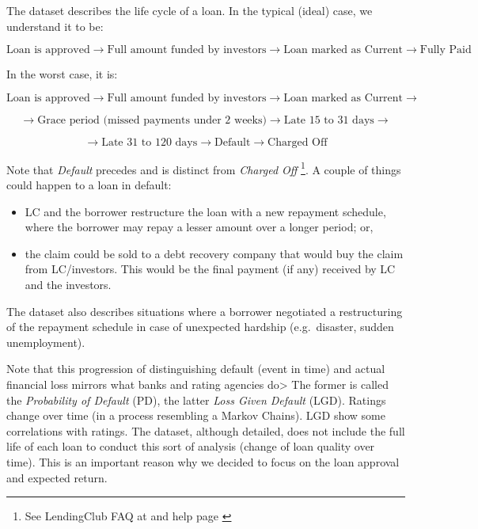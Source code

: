 \documentclass[11pt,]{report}
\let\rmarkdownfootnote\footnote%
\def\footnote{\protect\rmarkdownfootnote}
\begin{document}
The dataset describes the life cycle of a loan. In the typical (ideal) case, we understand it to be:

\[ 
\text{Loan is approved}  \rightarrow  \text{Full amount funded by investors} \rightarrow \text{Loan marked as Current} \rightarrow \text{Fully Paid}
\]

In the worst case, it is:

\[ 
\text{Loan is approved}  \rightarrow  \text{Full amount funded by investors} \rightarrow \text{Loan marked as Current} \rightarrow 
\]

\[
\rightarrow \text{Grace period (missed payments under 2 weeks)} \rightarrow \text{Late 15 to 31 days} \rightarrow
\]

\[
\rightarrow  \text{Late 31 to 120 days} \rightarrow  \text{Default} \rightarrow  \text{Charged Off}
\]

Note that \emph{Default} precedes and is distinct from \emph{Charged Off} \footnote{See LendingClub FAQ at \href{https://help.lendingclub.com/hc/en-us/articles/215488038}{} and help page \href{https://help.lendingclub.com/hc/en-us/articles/216127897-What-happens-when-a-loan-is-charged-off-}{}}. A couple of things could happen to a loan in default:

\begin{itemize}
\item
  LC and the borrower restructure the loan with a new repayment schedule, where the borrower may repay a lesser amount over a longer period; or,
\item
  the claim could be sold to a debt recovery company that would buy the claim from LC/investors. This would be the final payment (if any) received by LC and the investors.
\end{itemize}

The dataset also describes situations where a borrower negotiated a restructuring of the repayment schedule in case of unexpected hardship (e.g.~disaster, sudden unemployment).

Note that this progression of distinguishing default (event in time) and actual financial loss mirrors what banks and rating agencies do\textgreater{} The former is called the \emph{Probability of Default} (PD), the latter \emph{Loss Given Default} (LGD). Ratings change over time (in a process resembling a Markov Chains). LGD show some correlations with ratings. The dataset, although detailed, does not include the full life of each loan to conduct this sort of analysis (change of loan quality over time). This is an important reason why we decided to focus on the loan approval and expected return.
\end{document}
